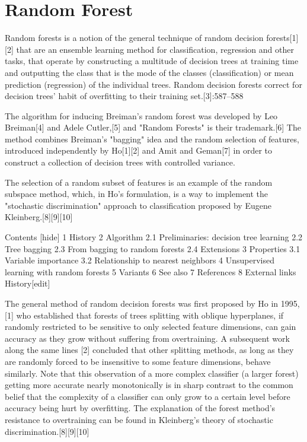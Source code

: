 \section{Random Forest}

Random forests is a notion of the general technique of random decision forests[1][2] that are an ensemble learning method for classification, regression and other tasks, that operate by constructing a multitude of decision trees at training time and outputting the class that is the mode of the classes (classification) or mean prediction (regression) of the individual trees. Random decision forests correct for decision trees' habit of overfitting to their training set.[3]:587–588

The algorithm for inducing Breiman's random forest was developed by Leo Breiman[4] and Adele Cutler,[5] and "Random Forests" is their trademark.[6] The method combines Breiman's "bagging" idea and the random selection of features, introduced independently by Ho[1][2] and Amit and Geman[7] in order to construct a collection of decision trees with controlled variance.

The selection of a random subset of features is an example of the random subspace method, which, in Ho's formulation, is a way to implement the "stochastic discrimination" approach to classification proposed by Eugene Kleinberg.[8][9][10]

Contents  [hide] 
1	History
2	Algorithm
2.1	Preliminaries: decision tree learning
2.2	Tree bagging
2.3	From bagging to random forests
2.4	Extensions
3	Properties
3.1	Variable importance
3.2	Relationship to nearest neighbors
4	Unsupervised learning with random forests
5	Variants
6	See also
7	References
8	External links
History[edit]


The general method of random decision forests was first proposed by Ho in 1995,[1] who established that forests of trees splitting with oblique hyperplanes, if randomly restricted to be sensitive to only selected feature dimensions, can gain accuracy as they grow without suffering from overtraining. A subsequent work along the same lines [2] concluded that other splitting methods, as long as they are randomly forced to be insensitive to some feature dimensions, behave similarly. Note that this observation of a more complex classifier (a larger forest) getting more accurate nearly monotonically is in sharp contrast to the common belief that the complexity of a classifier can only grow to a certain level before accuracy being hurt by overfitting. The explanation of the forest method's resistance to overtraining can be found in Kleinberg's theory of stochastic discrimination.[8][9][10]


